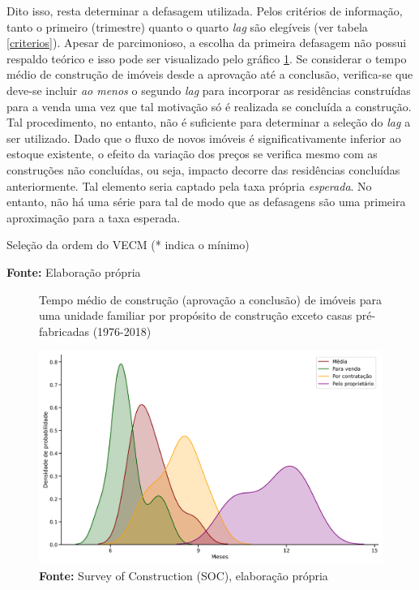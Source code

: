 Dito isso, resta determinar a defasagem utilizada. Pelos critérios de informação, tanto o primeiro (trimestre) quanto o quarto \textit{lag} são elegíveis (ver tabela \ref{criterios}). Apesar de parcimonioso, a escolha da primeira defasagem não possui respaldo teórico e isso pode ser visualizado pelo gráfico \ref{meses}. Se considerar o tempo médio de construção de imóveis desde a aprovação até a conclusão, verifica-se que deve-se incluir \textit{ao menos} o segundo \textit{lag} para incorporar as residências construídas para a venda uma vez que tal motivação só é realizada se concluída a construção. Tal procedimento, no entanto, não é suficiente para determinar a seleção do \textit{lag} a ser utilizado. Dado que o fluxo de novos imóveis é significativamente inferior ao estoque existente, o efeito da variação dos preços se verifica mesmo com as construções não concluídas, ou seja, impacto decorre das residências concluídas anteriormente.  Tal elemento seria captado pela taxa própria \textit{esperada}. No entanto, não há uma série para tal de modo que as defasagens são uma primeira aproximação para a taxa esperada.


\begin{table}[htb]
	\caption{Seleção da ordem do VECM (* indica o mínimo)}
	\label{criterios}

\caption*{\textbf{Fonte:} Elaboração própria}
\end{table}


\begin{figure}[H]
	\centering
	\caption{Tempo médio de construção (aprovação a conclusão) de imóveis para uma unidade familiar por propósito de construção exceto casas pré-fabricadas (1976-2018)}
	\label{meses}
	\includegraphics[width=\textwidth]{Fatos_Estilizados/Figs/Meses_contrucao.png}
	\caption*{\textbf{Fonte:} Survey of Construction (SOC), elaboração própria}
\end{figure}

